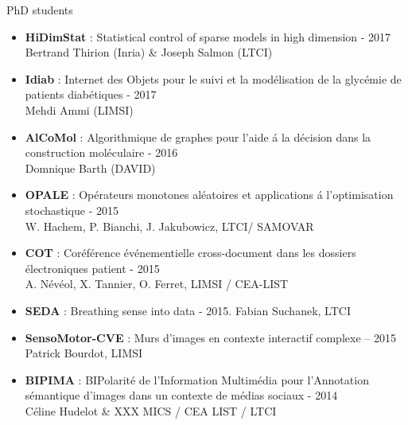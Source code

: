 \begin{frame}{PhD students}

\begin{itemize}
\item 
\small
\textbf{HiDimStat} : Statistical control of sparse models in high dimension - 2017
\\
Bertrand Thirion (Inria) \& Joseph Salmon (LTCI)
\item
\textbf{Idiab} : Internet des Objets pour le suivi et la mod\'elisation de la glyc\'emie de patients
diab\'etiques - 2017
\\
Mehdi Ammi (LIMSI)
\item
\textbf{AlCoMol} : Algorithmique de graphes pour l'aide \'a la d\'ecision dans la construction
mol\'eculaire - 2016
\\
Domnique Barth (DAVID)
\item 
\textbf{OPALE} : Op\'erateurs monotones al\'eatoires et applications \'a l'optimisation stochastique -
2015
\\
W. Hachem, P. Bianchi, J. Jakubowicz, LTCI/ SAMOVAR
\item 
\textbf{COT} : Cor\'ef\'erence \'ev\'enementielle cross-document dans les dossiers \'electroniques
patient - 2015
\\
A. Névéol, X. Tannier, O. Ferret, LIMSI / CEA-LIST
\item 
\textbf{SEDA} : Breathing sense into data - 2015. Fabian Suchanek, LTCI
\item 
\textbf{SensoMotor-CVE} : Murs d'images en contexte interactif complexe – 2015
\\
Patrick Bourdot, LIMSI
\item
\textbf{BIPIMA} : BIPolarit\'e de l'Information Multim\'edia pour l'Annotation s\'emantique d'images
dans un contexte de m\'edias sociaux - 2014
\\
C\'eline Hudelot \& XXX  MICS / CEA LIST / LTCI
\end{itemize}
\end{frame}

